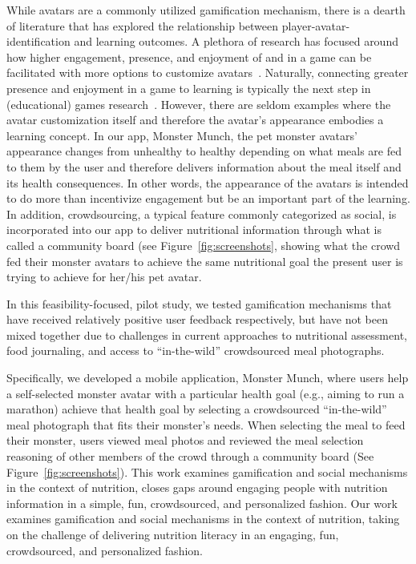 While avatars are a commonly utilized gamification mechanism, there is a dearth of literature that has explored the relationship between player-avatar-identification and learning outcomes. A plethora of research has focused around how higher engagement, presence, and enjoyment of and in a game can be facilitated with more options to customize avatars~\cite{ahn2017immersive,bailey2009avatar,birk2016fostering,li2013player,trepte2010avatar,turkay2014effects,turkay2015effects}. Naturally, connecting greater presence and enjoyment in a game to learning is typically the next step in (educational) games research~\cite{de2019algebright,huizenga2009mobile,lin2017character,lin2019evaluating,ng2013examining,vogel2006computer}. However, there are seldom examples where the avatar customization itself and therefore the avatar's appearance embodies a learning concept. In our app, Monster Munch, the pet monster avatars' appearance changes from unhealthy to healthy depending on what meals are fed to them by the user and therefore delivers information about the meal itself and its health consequences. In other words, the appearance of the avatars is intended to do more than incentivize engagement but be an important part of the learning. In addition, crowdsourcing, a typical feature commonly categorized as social, is incorporated into our app to deliver nutritional information through what is called a community board (see Figure~\ref{fig:screenshots}, showing what the crowd fed their monster avatars to achieve the same nutritional goal the present user is trying to achieve for her/his pet avatar.

In this feasibility-focused, pilot study, we tested gamification mechanisms that have received relatively positive user feedback respectively, but have not been mixed together due to challenges in current approaches to nutritional assessment, food journaling, and access to ``in-the-wild'' crowdsourced meal photographs.

Specifically, we developed a mobile application, Monster Munch, where users help a self-selected monster avatar with a particular health goal (e.g., aiming to run a marathon) achieve that health goal by selecting a crowdsourced ``in-the-wild'' meal photograph that fits their monster's needs. When selecting the meal to feed their monster, users viewed meal photos and reviewed the meal selection reasoning of other members of the crowd through a community board (See Figure~\ref{fig:screenshots}). This work examines gamification and social mechanisms in the context of nutrition, closes gaps around engaging people with nutrition information in a simple, fun, crowdsourced, and personalized fashion. Our work examines gamification and social mechanisms in the context of nutrition, taking on the challenge of delivering nutrition literacy in an engaging, fun, crowdsourced, and personalized fashion.

